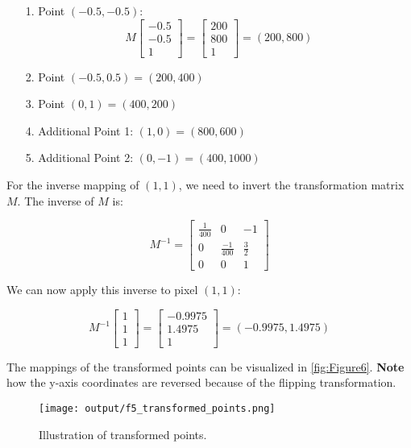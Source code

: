 \documentclass[12pt]{report}
\begin{document}
\begin{enumerate}
    \begin{enumerate}
    \item[1.] Point \((-0.5, -0.5)\): \\
    $$
    M 
    \begin{bmatrix}
    -0.5 \\
    -0.5 \\
    1
    \end{bmatrix}
    =
    \begin{bmatrix}
    200 \\
    800 \\
    1
    \end{bmatrix}
    = (200, 800)
    $$

    \item[2.] Point \((-0.5, 0.5) = (200, 400)\)

    \item[3.] Point \((0, 1) = (400, 200)\)

    \item[4.] Additional Point 1: \((1, 0) = (800, 600)\)

    \item[5.] Additional Point 2: \((0, -1) = (400, 1000)\)

    \end{enumerate}

    For the inverse mapping of \((1,1)\), we need to invert the transformation matrix \(M\). The inverse of \(M\) is:

    $$
    M^{-1} =
    \begin{bmatrix}
    \frac{1}{400} & 0 & -1 \\
    0 & \frac{-1}{400} & \frac{3}{2} \\
    0 & 0 & 1
    \end{bmatrix}
    $$
    
    We can now apply this inverse to pixel \((1,1)\):

    $$
    M^{-1}
    \begin{bmatrix}
    1 \\
    1 \\
    1
    \end{bmatrix}
    =
    \begin{bmatrix}
    -0.9975 \\
    1.4975 \\
    1
    \end{bmatrix}
    = (-0.9975, 1.4975)
    $$

    The mappings of the transformed points can be visualized in \autoref{fig:Figure6}. \textbf{Note} how the y-axis coordinates are 
    reversed because of the flipping transformation.
    \begin{figure}[H]
        \centering
        \texttt{[image: output/f5\_transformed\_points.png]}
        \caption{Illustration of transformed points.}
        \label{fig:Figure6}
    \end{figure}

    \FloatBarrier 

\end{enumerate}
\end{document}
